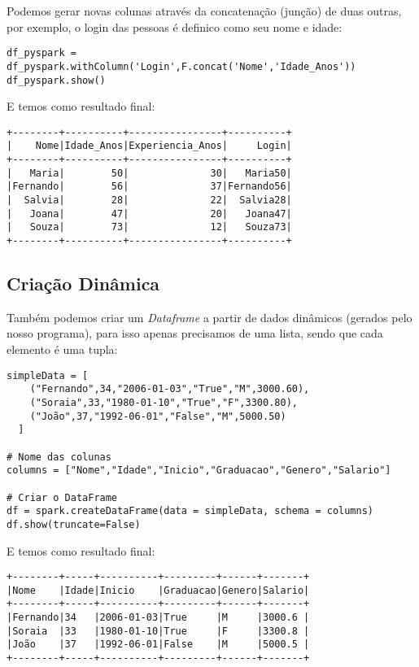 Podemos gerar novas colunas através da concatenação (junção) de duas outras, por exemplo, o login das pessoas é definico como seu nome e idade:
\begin{lstlisting}[]
df_pyspark = df_pyspark.withColumn('Login',F.concat('Nome','Idade_Anos'))
df_pyspark.show()
\end{lstlisting}

E temos como resultado final: \vspace{-1.5em}
\begin{verbatim}
+--------+----------+----------------+----------+
|    Nome|Idade_Anos|Experiencia_Anos|     Login|
+--------+----------+----------------+----------+
|   Maria|        50|              30|   Maria50|
|Fernando|        56|              37|Fernando56|
|  Salvia|        28|              22|  Salvia28|
|   Joana|        47|              20|   Joana47|
|   Souza|        73|              12|   Souza73|
+--------+----------+----------------+----------+
\end{verbatim}

\subsection{Criação Dinâmica}
Também podemos criar um \textit{Dataframe} a partir de dados dinâmicos (gerados pelo nosso programa), para isso apenas precisamos de uma lista, sendo que cada elemento é uma tupla:
\begin{lstlisting}[]
simpleData = [
    ("Fernando",34,"2006-01-03","True","M",3000.60),
    ("Soraia",33,"1980-01-10","True","F",3300.80),
    ("João",37,"1992-06-01","False","M",5000.50)
  ]

# Nome das colunas
columns = ["Nome","Idade","Inicio","Graduacao","Genero","Salario"]

# Criar o DataFrame
df = spark.createDataFrame(data = simpleData, schema = columns)
df.show(truncate=False)
\end{lstlisting}

E temos como resultado final: \vspace{-1.5em}
\begin{verbatim}
+--------+-----+----------+---------+------+-------+
|Nome    |Idade|Inicio    |Graduacao|Genero|Salario|
+--------+-----+----------+---------+------+-------+
|Fernando|34   |2006-01-03|True     |M     |3000.6 |
|Soraia  |33   |1980-01-10|True     |F     |3300.8 |
|João    |37   |1992-06-01|False    |M     |5000.5 |
+--------+-----+----------+---------+------+-------+
\end{verbatim}

